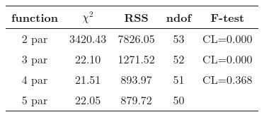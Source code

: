 \begin{tabular}{c|c|c|c|c}
function & $\chi^2$ & RSS & ndof & F-test \\
\hline
2 par & 3420.43 & 7826.05 & 53 & CL=0.000 \\
3 par & 22.10 & 1271.52 & 52 & CL=0.000 \\
4 par & 21.51 & 893.97 & 51 & CL=0.368 \\
5 par & 22.05 & 879.72 & 50 & \\
\hline
\end{tabular}